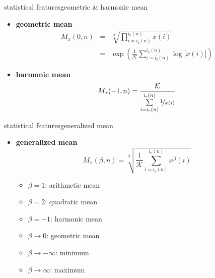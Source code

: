         \begin{frame}{statistical features}{geometric \& harmonic mean}
			\begin{itemize}
				\item	\textbf{geometric mean}
				\begin{eqnarray*}
					M_x(0,n)		&=& \sqrt[\mathcal{K}]{\prod\limits_{i=i_{\mathrm{s}}(n)}^{i_{\mathrm{e}}(n)}{x(i)}}\label{eq:geo_mean1}\\
								&=& \exp\left({\frac{1}{\mathcal{K}}\sum\limits_{i=i_{\mathrm{s}}(n)}^{i_{\mathrm{e}}(n)}{\log\big[x(i)\big]}}\right) \label{eq:geo_mean2}
				\end{eqnarray*}
                \pause
				\item	\textbf{harmonic mean}
				\begin{equation*}
					M_x(-1,n) = \frac{\mathcal{K}}{\sum\limits_{i=i_{\mathrm{s}}(n)}^{i_{\mathrm{e}}(n)}{\nicefrac{1}{x(i)}}} 
				\end{equation*}
			\end{itemize}
        \end{frame}
        \begin{frame}{statistical features}{generalized mean}
			\begin{itemize}
				\item	\textbf{generalized mean}
                    \begin{equation*}
                        M_x(\beta,n) = \sqrt[\beta]{\frac{1}{\mathcal{K}}\sum\limits_{i=i_{\mathrm{s}}(n)}^{i_{\mathrm{e}}(n)}{x^\beta(i)}} 
                    \end{equation*}
				\pause
                    \begin{footnotesize}
                    \begin{itemize}
                        \item	{$\beta=1$:} {arithmetic mean}
                        \item	{$\beta=2$:} {quadratic mean}
                        \item	{$\beta=-1$:} {harmonic mean}
                        \item	{$\beta\rightarrow 0$:} {geometric mean}
                        \item	{$\beta\rightarrow -\infty$:} {minimum}
                        \item	{$\beta\rightarrow \infty$:} {maximum}
                    \end{itemize}
                    \end{footnotesize}
			\end{itemize}
        \end{frame}
